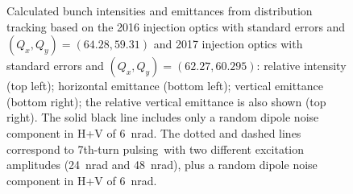 \documentclass[%
 reprint,
 amsmath,amssymb,
 aps,
prstab,
longbibliography
]{revtex4-1}
\newcommand{\seventhtp}{7th-turn pulsing}
\begin{document}
\begin{figure}
\begin{tabular}{cc}
  \end{tabular}
  \caption{Calculated bunch intensities and emittances from
    distribution tracking based on the 2016 injection optics with
    standard errors and $(Q_x, Q_y) = (64.28, 59.31)$ and 2017
    injection optics with standard errors and
    $(Q_x, Q_y) = (62.27, 60.295)$: relative intensity (top left);
    horizontal emittance (bottom left); vertical emittance (bottom
    right); the relative vertical emittance is also shown (top
    right). The solid black line includes only a random dipole noise
    component in H+V of 6~nrad. The dotted and dashed lines correspond
    to \seventhtp\ with two different excitation amplitudes (24~nrad
    and 48~nrad), plus a random dipole noise component in H+V of
    6~nrad.}
  \label{fig:7thsim}
\end{figure}
\end{document}
